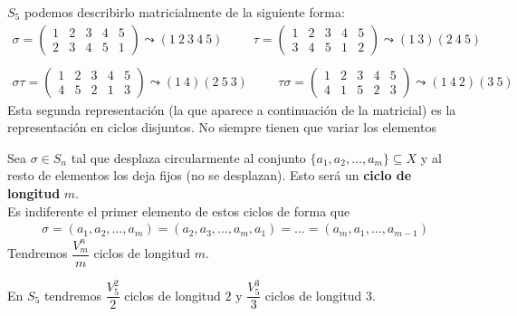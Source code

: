  \begin{ejemplo}
    $S_5$ podemos describirlo matricialmente de la siguiente forma:
    \begin{align*}
        \sigma=\begin{pmatrix}
            1 & 2 & 3 & 4 & 5\\
             2 & 3 & 4 & 5 & 1
        \end{pmatrix} \leadsto (1\ 2\ 3\ 4\ 5)
        \hspace{1cm}
        \tau=\begin{pmatrix}
            1 & 2 & 3 & 4 & 5\\
            3 & 4 & 5 & 1 & 2
        \end{pmatrix} \leadsto (1\ 3)(2\ 4\ 5)\\\\
        \sigma\tau=\begin{pmatrix}
            1 & 2 & 3 & 4 & 5\\
            4 & 5 & 2 & 1 & 3
        \end{pmatrix} \leadsto (1\ 4)(2\ 5\ 3)
        \hspace{1cm}
        \tau\sigma=\begin{pmatrix}
            1 & 2 & 3 & 4 & 5\\
            4 & 1 & 5 & 2 & 3
        \end{pmatrix} \leadsto (1\ 4\ 2)(3\ 5)
    \end{align*}
    Esta segunda representación (la que aparece a continuación de la matricial) es la representación en ciclos disjuntos. No siempre tienen que variar los elementos
 \end{ejemplo}

 \begin{definicion}
    Sea $\sigma\in S_n$ tal que desplaza circularmente al conjunto $\{a_1,a_2,\dots,a_m\}\subseteq X$ y al resto de elementos los deja fijos (no se desplazan). Esto será un \textbf{ciclo de longitud} $m$.\\

    Es indiferente el primer elemento de estos ciclos de forma que
    \begin{align*}
        \sigma=(a_1,a_2,\dots,a_m) = (a_2,a_3,\dots,a_m,a_1) = \dots = (a_m, a_1, \dots, a_{m-1})
    \end{align*}
    Tendremos $\dfrac{V_m^n}{m}$ ciclos de longitud $m$.
 \end{definicion}

 \begin{ejemplo}
    En $S_5$ tendremos $\dfrac{V_5^2}{2}$ ciclos de longitud $2$ y $\dfrac{V_5^3}{3}$ ciclos de longitud $3$.
 \end{ejemplo}

